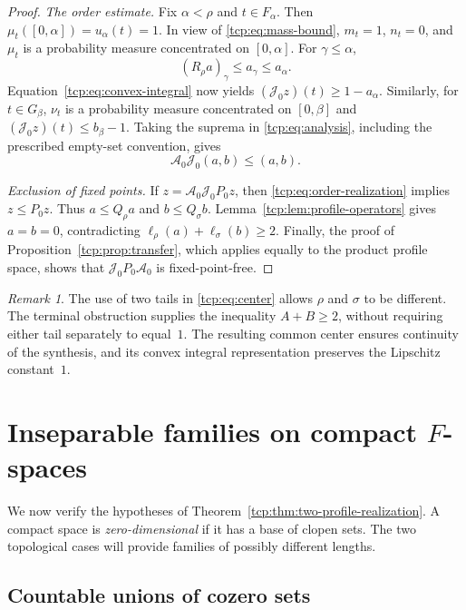 \documentclass[preprint,12pt,nopreprintline]{elsarticle}
\theoremstyle{definition}
\theoremstyle{remark}
\newtheorem{remark}[theorem]{Remark}
\numberwithin{equation}{section}
\begin{document}
\begin{proof}
\smallskip\noindent
\emph{The order estimate.} Fix $\alpha<\rho$ and $t\in F_\alpha$. Then $\mu_t([0,\alpha])=u_\alpha(t)=1$. In view of \eqref{tcp:eq:mass-bound}, $m_t=1$, $n_t=0$, and $\mu_t$ is a probability measure concentrated on $[0,\alpha]$. For $\gamma\le\alpha$,
\[
(R_\rho a)_\gamma\le a_\gamma\le a_\alpha.
\]
Equation~\eqref{tcp:eq:convex-integral} now yields $(\mathcal J_0z)(t)\ge1-a_\alpha$. Similarly, for $t\in G_\beta$, $\nu_t$ is a probability measure concentrated on $[0,\beta]$ and $(\mathcal J_0z)(t)\le b_\beta-1$. Taking the suprema in \eqref{tcp:eq:analysis}, including the prescribed empty-set convention, gives
\begin{equation}
\mathcal A_0\mathcal J_0(a,b)\le(a,b).
 \label{tcp:eq:order-realization}
\end{equation}

\smallskip\noindent
\emph{Exclusion of fixed points.} If $z=\mathcal A_0\mathcal J_0P_0z$, then \eqref{tcp:eq:order-realization} implies $z\le P_0z$. Thus $a\le Q_\rho a$ and $b\le Q_\sigma b$. Lemma~\ref{tcp:lem:profile-operators} gives $a=b=0$, contradicting
$\ell_\rho(a)+\ell_\sigma(b)\ge2$. Finally, the proof of Proposition~\ref{tcp:prop:transfer}, which applies equally to the product profile space, shows that $\mathcal J_0P_0\mathcal A_0$ is fixed-point-free.
\end{proof}

\begin{remark}
The use of two tails in \eqref{tcp:eq:center} allows $\rho$ and $\sigma$ to be different. The terminal obstruction supplies the
inequality $A+B\ge2$, without requiring either tail separately to equal~$1$. The resulting common center ensures continuity of the
synthesis, and its convex integral representation preserves the Lipschitz constant~$1$.
\end{remark}


\section{Inseparable families on compact \texorpdfstring{$F$}{F}-spaces}
\label{sec:families}
\label{tcp:subsec:families}

We now verify the hypotheses of Theorem~\ref{tcp:thm:two-profile-realization}. A compact space is
\emph{zero-dimensional} if it has a base of clopen sets. The two topological cases will provide families of possibly different lengths.

\subsection{Countable unions of cozero sets}
\label{tcp:subsec:topological-preliminaries}
\end{document}
